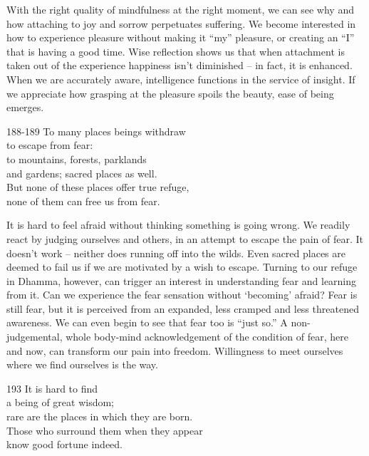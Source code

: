 \begin{dhpRefl}

With the right quality of mindfulness at the right moment, we can see
why and how attaching to joy and sorrow perpetuates suffering. We
become interested in how to experience pleasure without making it
``my'' pleasure, or creating an ``I'' that is having a good time. Wise
reflection shows us that when attachment is taken out of the
experience happiness isn't diminished -- in fact, it is enhanced. When
we are accurately aware, intelligence functions in the service of
insight. If we appreciate how grasping at the pleasure spoils the
beauty, ease of being emerges.

\end{dhpRefl}


\begin{dhpVerse}{188-189}
\label{dhp-188}\label{dhp-189}
To many places beings withdraw\\
to escape from fear:\\
to mountains, forests, parklands\\
and gardens; sacred places as well.\\
But none of these places offer true refuge,\\
none of them can free us from fear.
\end{dhpVerse}

\begin{dhpRefl}

It is hard to feel afraid without thinking something is going wrong.
We readily react by judging ourselves and others, in an attempt to
escape the pain of fear. It doesn't work -- neither does running off
into the wilds. Even sacred places are deemed to fail us if we are
motivated by a wish to escape. Turning to our refuge in Dhamma,
however, can trigger an interest in understanding fear and learning
from it. Can we experience the fear sensation without `becoming'
afraid? Fear is still fear, but it is perceived from an expanded, less
cramped and less threatened awareness. We can even begin to see that
fear too is ``just so.'' A non-judgemental, whole body-mind
acknowledgement of the condition of fear, here and now, can transform
our pain into freedom. Willingness to meet ourselves where we find
ourselves is the way.

\end{dhpRefl}


\begin{dhpVerse}{193}
\label{dhp-193}
It is hard to find\\
a being of great wisdom;\\
rare are the places in which they are born.\\
Those who surround them when they appear\\
know good fortune indeed.
\end{dhpVerse}


